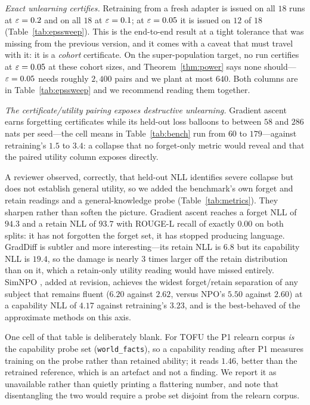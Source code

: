 \emph{Exact unlearning certifies.} Retraining from a fresh adapter is issued on all
$18$ runs at $\varepsilon = 0.2$ and on all $18$ at $\varepsilon = 0.1$; at $\varepsilon = 0.05$ it is
issued on $12$ of $18$ (Table~\ref{tab:epssweep}). This is the end-to-end result at a
tight tolerance that was missing from the previous version, and it comes with a
caveat that must travel with it: it is a \emph{cohort} certificate. On the
super-population target, no run certifies at $\varepsilon = 0.05$ at these cohort sizes, and
Theorem~\ref{thm:power} says none should---$\varepsilon=0.05$ needs roughly $2{,}400$ pairs
and we plant at most $640$. Both columns are in Table~\ref{tab:epssweep} and we
recommend reading them together.

\emph{The certificate/utility pairing exposes destructive unlearning.} Gradient ascent
earns forgetting certificates while its held-out loss balloons to between $58$ and
$286$ nats per seed---the cell means in Table~\ref{tab:bench} run from $60$ to
$179$---against retraining's $1.5$ to $3.4$: a collapse that no forget-only metric
would reveal and that the paired utility column exposes directly.

A reviewer observed, correctly, that held-out NLL identifies severe collapse but does
not establish general utility, so we added the benchmark's own forget and retain
readings and a general-knowledge probe (Table~\ref{tab:metrics}). They sharpen rather
than soften the picture. Gradient ascent reaches a forget NLL of $94.3$ and a retain
NLL of $93.7$ with ROUGE-L recall of exactly $0.00$ on both splits: it has not
forgotten the forget set, it has stopped producing language. GradDiff is subtler and
more interesting---its retain NLL is $6.8$ but its capability NLL is $19.4$, so the
damage is nearly $3$ times larger off the retain distribution than on it, which a
retain-only utility reading would have missed entirely. SimNPO \citep{fan2025simnpo},
added at revision, achieves the widest forget/retain separation of any subject that
remains fluent ($6.20$ against $2.62$, versus NPO's $5.50$ against $2.60$) at a
capability NLL of $4.17$ against retraining's $3.23$, and is the best-behaved of the
approximate methods on this axis.

One cell of that table is deliberately blank. For TOFU the P1 relearn corpus
\emph{is} the capability probe set (\texttt{world\_facts}), so a capability reading
after P1 measures training on the probe rather than retained ability; it reads $1.46$,
better than the retrained reference, which is an artefact and not a finding. We report
it as unavailable rather than quietly printing a flattering number, and note that
disentangling the two would require a probe set disjoint from the relearn corpus.

